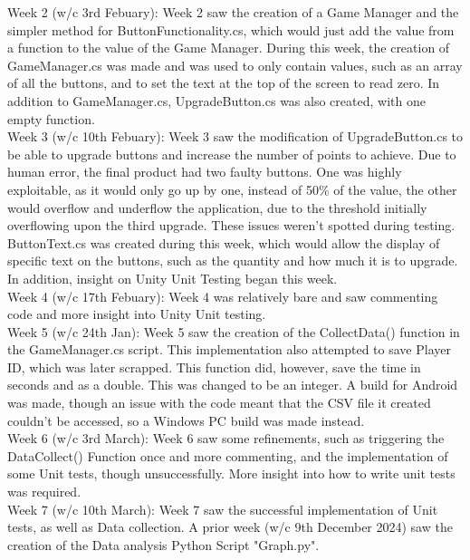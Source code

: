 \documentclass[conference]{IEEEtran}
\begin{document}
Week 2 (w/c 3rd Febuary):
Week 2 saw the creation of a Game Manager and the simpler method for ButtonFunctionality.cs, which would just add the value from a function to the value of the Game Manager. During this week, the creation of GameManager.cs was made and was used to only contain values, such as an array of all the buttons, and to set the text at the top of the screen to read zero. In addition to GameManager.cs, UpgradeButton.cs was also created, with one empty function.\\

Week 3 (w/c 10th Febuary):
Week 3 saw the modification of UpgradeButton.cs to be able to upgrade buttons and increase the number of points to achieve. Due to human error, the final product had two faulty buttons. One was highly exploitable, as it would only go up by one, instead of 50\% of the value, the other would overflow and underflow the application, due to the threshold initially overflowing upon the third upgrade. These issues weren't spotted during testing. ButtonText.cs was created during this week, which would allow the display of specific text on the buttons, such as the quantity and how much it is to upgrade. In addition, insight on Unity Unit Testing began this week.\\

Week 4 (w/c 17th Febuary):
Week 4  was relatively bare and saw commenting code and more insight into Unity Unit testing.\\

Week 5 (w/c 24th Jan):
Week 5 saw the creation of the CollectData() function in the GameManager.cs script. This implementation also attempted to save Player ID, which was later scrapped. This function did, however, save the time in seconds and as a double. This was changed to be an integer. A build for Android was made, though an issue with the code meant that the CSV file it created couldn't be accessed, so a Windows PC build was made instead.\\

Week 6 (w/c 3rd March):
Week 6 saw some refinements, such as triggering the DataCollect() Function once and more commenting, and the implementation of some Unit tests, though unsuccessfully. More insight into how to write unit tests was required.\\

Week 7 (w/c 10th March):
Week 7 saw the successful implementation of Unit tests, as well as Data collection. A prior week (w/c 9th December 2024) saw the creation of the Data analysis Python Script "Graph.py".\\
\end{document}

